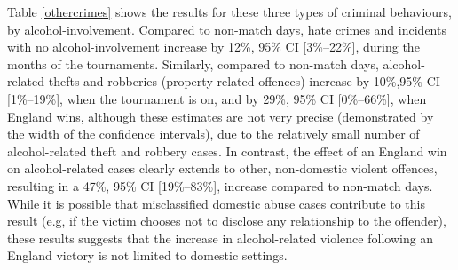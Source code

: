 \documentclass[12pt, a4paper]{article}
\begin{document}
Table \ref{othercrimes} shows the results for these three types of criminal behaviours, by alcohol-involvement. Compared to non-match days, hate crimes and incidents with no alcohol-involvement increase by 12\%, 95\% CI [3\%--22\%], during the months of the tournaments. Similarly, compared to non-match days, alcohol-related thefts and robberies (property-related offences) increase by 10\%,95\% CI [1\%--19\%], when the tournament is on, and by 29\%, 95\% CI [0\%--66\%], when England wins, although these estimates are not very precise (demonstrated by the width of the confidence intervals), due to the relatively small number of alcohol-related theft and robbery cases. In contrast, the effect of an England win on alcohol-related cases clearly extends to other, non-domestic violent offences, resulting in a 47\%, 95\% CI [19\%--83\%], increase compared to non-match days. While it is possible that misclassified domestic abuse cases contribute to this result (e.g, if the victim chooses not to disclose any relationship to the offender), these results suggests that the increase in alcohol-related violence following an England victory is not limited to domestic settings.
\end{document}
